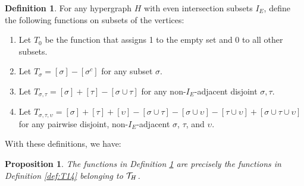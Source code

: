 \documentclass[12pt]{article}
\newtheorem{proposition}[theorem]{Proposition}
\theoremstyle{definition}
\newtheorem{definition}[theorem]{Definition}
\begin{document}
\begin{definition}\label{def:H4}
For any hypergraph $H$ with even intersection subsets $I_E$, define the following functions on subsets of the vertices:
\begin{enumerate}
    \item Let $T_0$ be the function that assigns 1 to the empty set and 0 to all other subsets.
    \item Let $T_\sigma = [\sigma] - [\sigma^c]$ for any subset $\sigma$.
    \item Let $T_{\sigma,\tau} = [\sigma] + [\tau] - [\sigma \cup \tau]$ for any non-$I_E$-adjacent disjoint $\sigma, \tau$. 
    \item Let $T_{\sigma,\tau,\upsilon} = [\sigma] + [\tau]  + [\upsilon] - [\sigma \cup \tau ] - [\sigma\cup \upsilon] -[ \tau \cup \upsilon] + [\sigma \cup \tau \cup \upsilon]$ for any pairwise disjoint, non-$I_E$-adjacent $\sigma$, $\tau$, and $\upsilon$. 
\end{enumerate}
\end{definition}
With these definitions, we have:
\begin{proposition}
\label{thm:Möbius2}
    The functions in Definition \ref{def:H4} are precisely the functions in Definition \ref{def:T14} belonging to ${\cal T}_H$.
\end{proposition}
\end{document}
